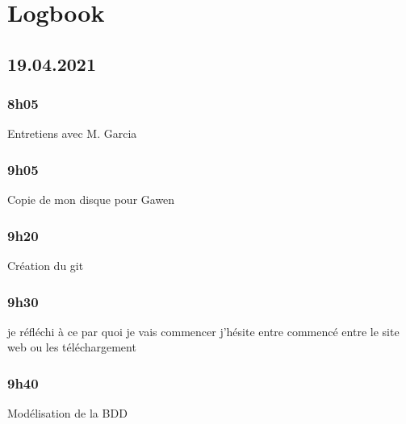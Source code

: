 \documentclass[a4paper,12pt,french]{sphinxmanual}
\begin{document}
\sphinxAtStartPar
{}

\sphinxAtStartPar
{}

\sphinxAtStartPar
{}


\chapter{Logbook}
\label{\detokenize{logbook:logbook}}\label{\detokenize{logbook::doc}}

\section{19.04.2021}
\label{\detokenize{logbook:id1}}

\subsection{8h05}
\label{\detokenize{logbook:h05}}
\sphinxAtStartPar
Entretiens avec M. Garcia


\subsection{9h05}
\label{\detokenize{logbook:id2}}
\sphinxAtStartPar
Copie de mon disque pour Gawen


\subsection{9h20}
\label{\detokenize{logbook:h20}}
\sphinxAtStartPar
Création du git


\subsection{9h30}
\label{\detokenize{logbook:h30}}
\sphinxAtStartPar
je réfléchi à ce par quoi je vais commencer j’hésite entre commencé entre le site web ou les téléchargement


\subsection{9h40}
\label{\detokenize{logbook:h40}}
\sphinxAtStartPar
Modélisation de la BDD
\end{document}
